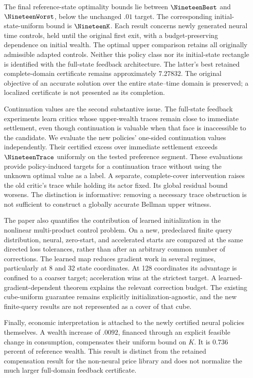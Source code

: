 The final reference-state optimality bounds lie between $\NineteenBest$ and $\NineteenWorst$, below the unchanged $.01$ target. The corresponding initial-state-uniform bound is $\NineteenK$. Each result concerns newly generated neural time controls, held until the original first exit, with a budget-preserving dependence on initial wealth. The optimal upper comparison retains all originally admissible adapted controls. Neither this policy class nor its initial-state rectangle is identified with the full-state feedback architecture. The latter's best retained complete-domain certificate remains approximately $7.27832$. The original objective of an accurate solution over the entire state--time domain is preserved; a localized certificate is not presented as its completion.

Continuation values are the second substantive issue. The full-state feedback experiments learn critics whose upper-wealth traces remain close to immediate settlement, even though continuation is valuable when that face is inaccessible to the candidate. We evaluate the new policies' one-sided continuation values independently. Their certified excess over immediate settlement exceeds $\NineteenTrace$ uniformly on the tested preference segment. These evaluations provide policy-induced targets for a continuation trace without using the unknown optimal value as a label. A separate, complete-cover intervention raises the old critic's trace while holding its actor fixed. Its global residual bound worsens. The distinction is informative: removing a necessary trace obstruction is not sufficient to construct a globally accurate Bellman upper witness.

The paper also quantifies the contribution of learned initialization in the nonlinear multi-product control problem. On a new, predeclared finite query distribution, neural, zero-start, and accelerated starts are compared at the same directed loss tolerances, rather than after an arbitrary common number of corrections. The learned map reduces gradient work in several regimes, particularly at 8 and 32 state coordinates. At 128 coordinates its advantage is confined to a coarser target; acceleration wins at the strictest target. A learned-gradient-dependent theorem explains the relevant correction budget. The existing cube-uniform guarantee remains explicitly initialization-agnostic, and the new finite-query results are not represented as a cover of that cube.

Finally, economic interpretation is attached to the newly certified neural policies themselves. A wealth increase of $.0092$, financed through an explicit feasible change in consumption, compensates their uniform bound on $K$. It is 0.736 percent of reference wealth. This result is distinct from the retained compensation result for the non-neural price library and does not normalize the much larger full-domain feedback certificate.

